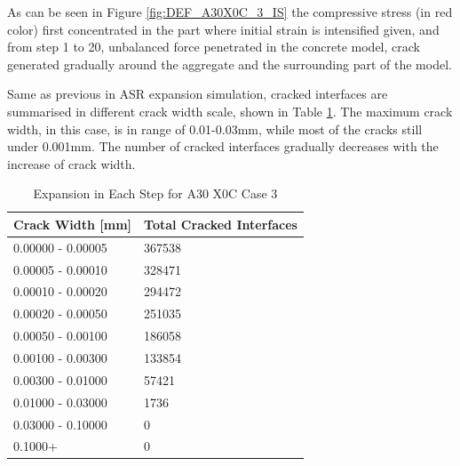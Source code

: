 As can be seen in Figure \ref{fig:DEF_A30X0C_3_IS} the compressive stress (in red color) first concentrated in the part where initial strain is intensified given, and from step 1 to 20, unbalanced force penetrated in the concrete model, crack generated gradually around the aggregate and the surrounding part of the model.

Same as previous in ASR expansion simulation,  cracked interfaces are summarised in different crack width scale, shown in Table \ref{table:A30X0C_3_Cracks}. The maximum crack width, in this case, is in range of 0.01-0.03mm, while most of the cracks still under 0.001mm. The number of cracked interfaces gradually decreases with the increase of crack width.

\begin{table}[!h]
\centering
\begin{tabular}{ |p{4cm}|p{5cm}| }
\hline
 Crack Width [mm] &  Total Cracked Interfaces \\
 \hline\hline

   0.00000 - 0.00005 & 367538 \\
   0.00005 - 0.00010 & 328471 \\
   0.00010 - 0.00020 & 294472 \\
   0.00020 - 0.00050 & 251035 \\
   0.00050 - 0.00100 & 186058 \\
   0.00100 - 0.00300 & 133854 \\
   0.00300 - 0.01000 & 57421 \\
   0.01000 - 0.03000 & 1736 \\
   0.03000 - 0.10000 & 0 \\
   0.1000+ & 0 \\

  \hline
  \end{tabular}
\caption{Expansion in Each Step for A30 X0C Case 3}
\label{table:A30X0C_3_Cracks}
\end{table}
